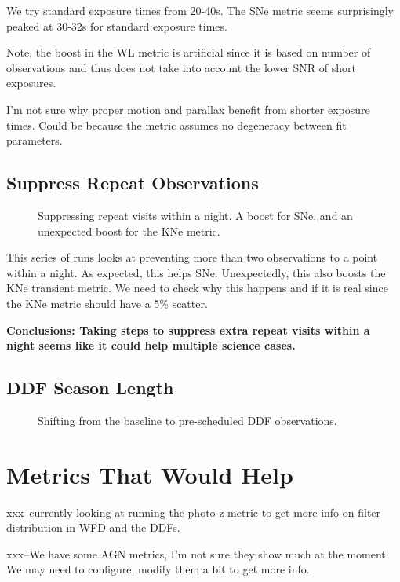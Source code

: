 We try standard exposure times from 20-40s.  The SNe metric seems surprisingly peaked at 30-32s for standard exposure times. 

Note, the boost in the WL metric is artificial since it is based on number of observations and thus does not take into account the lower SNR of short exposures. 


I'm not sure why proper motion and parallax benefit from shorter exposure times. Could be because the metric assumes no degeneracy between fit parameters. 

\subsection{Suppress Repeat Observations}


\begin{figure}
\caption{Suppressing repeat visits within a night. A boost for SNe, and an unexpected boost for the KNe metric. }
\end{figure}


This series of runs looks at preventing more than two observations to a point within a night. As expected, this helps SNe. Unexpectedly, this also boosts the KNe transient metric. We need to check why this happens and if it is real since the KNe metric should have a 5\% scatter.


{\bf Conclusions:  Taking steps to suppress extra repeat visits within a night seems like it could help multiple science cases.}


\subsection{DDF Season Length}



\begin{figure}
\caption{Shifting from the baseline to pre-scheduled DDF observations.}
\end{figure}

\section{Metrics That Would Help}

xxx--currently looking at running the photo-z metric to get more info on filter distribution in WFD and the DDFs.

xxx--We have some AGN metrics, I'm not sure they show much at the moment. We may need to configure, modify them a bit to get more info.

